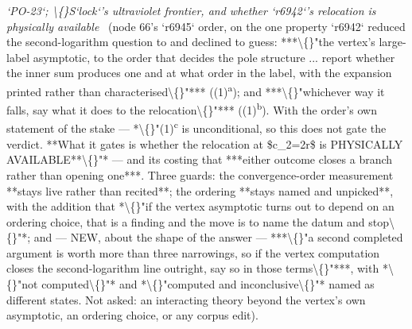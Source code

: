 \begin{description}
\textit{`PO-23`; \textbackslash\{\}S`lock`'s ultraviolet frontier, and whether `r6942`'s relocation is physically available} \ (node 66's `r6945` order, on the one property `r6942` reduced the second-logarithm question to and declined to guess: ***\textbackslash\{\}"the vertex's large-label asymptotic, to the order that decides the pole structure ... report whether the inner sum produces one and at what order in the label, with the expansion printed rather than characterised\textbackslash\{\}"*** ((1)\textsuperscript{a}); and ***\textbackslash\{\}"whichever way it falls, say what it does to the relocation\textbackslash\{\}"*** ((1)\textsuperscript{b}).  With the order's own statement of the stake --- *\textbackslash\{\}"(1)\textsuperscript{c} is unconditional, so this does not gate the verdict. **What it gates is whether the relocation at \$c\_2=2r\$ is PHYSICALLY AVAILABLE**\textbackslash\{\}"* --- and its costing that ***either outcome closes a branch rather than opening one***.  Three guards: the convergence-order measurement **stays live rather than recited**; the ordering **stays named and unpicked**, with the addition that *\textbackslash\{\}"if the vertex asymptotic turns out to depend on an ordering choice, that is a finding and the move is to name the datum and stop\textbackslash\{\}"*; and --- NEW, about the shape of the answer --- ***\textbackslash\{\}"a second completed argument is worth more than three narrowings, so if the vertex computation closes the second-logarithm line outright, say so in those terms\textbackslash\{\}"***, with *\textbackslash\{\}"not computed\textbackslash\{\}"* and *\textbackslash\{\}"computed and inconclusive\textbackslash\{\}"* named as different states.  Not asked: an interacting theory beyond the vertex's own asymptotic, an ordering choice, or any corpus edit). 

\end{description}
